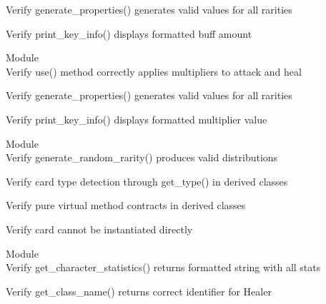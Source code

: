 \begin{DoxyRefList}
\label{test__test000056}%
%
Verify generate\+\_\+properties() generates valid values for all rarities  



\label{test__test000057}%
%
Verify print\+\_\+key\+\_\+info() displays formatted buff amount  


\item[Module \doxylink{group___buff_spell}{Buff\+Spell} ]\hfill \\
\label{test__test000023}%
%
Verify use() method correctly applies multipliers to attack and heal  



\label{test__test000024}%
%
Verify generate\+\_\+properties() generates valid values for all rarities  



\label{test__test000025}%
%
Verify print\+\_\+key\+\_\+info() displays formatted multiplier value  


\item[Module \doxylink{group___card}{Card} ]\hfill \\
\label{test__test000003}%
%
Verify generate\+\_\+random\+\_\+rarity() produces valid distributions  



\label{test__test000004}%
%
Verify card type detection through get\+\_\+type() in derived classes  



\label{test__test000005}%
%
Verify pure virtual method contracts in derived classes  



\label{test__test000006}%
%
Verify card cannot be instantiated directly  


\item[Module \doxylink{group___character}{Character} ]\hfill \\
\label{test__test000103}%
%
Verify get\+\_\+character\+\_\+statistics() returns formatted string with all stats  



\label{test__test000104}%
%
Verify get\+\_\+class\+\_\+name() returns correct identifier for Healer  




\end{DoxyRefList}
